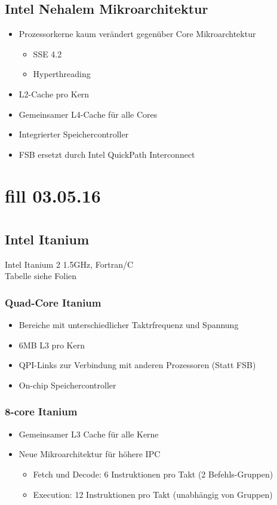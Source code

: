 \subsection{Intel Nehalem Mikroarchitektur}
\begin{itemize}
	\item Prozessorkerne kaum verändert gegenüber Core Mikroarchtektur
	\begin{itemize}
		\item SSE 4.2
		\item Hyperthreading
	\end{itemize}
	\item L2-Cache pro Kern
	\item Gemeinsamer L4-Cache für alle Cores
	\item Integrierter Speichercontroller
	\item FSB ersetzt durch Intel QuickPath Interconnect
\end{itemize}
\section{fill 03.05.16}
\section{}
\subsection{Intel Itanium}
Intel Itanium 2 1.5GHz, Fortran/C \\
Tabelle siehe Folien
\subsubsection{Quad-Core Itanium} 
\begin{itemize}
	\item Bereiche mit unterschiedlicher Taktrfrequenz und Spannung
	\item 6MB L3 pro Kern
	\item QPI-Links zur Verbindung mit anderen Prozessoren (Statt FSB)
	\item On-chip Speichercontroller
\end{itemize}
\subsubsection{8-core Itanium}
\begin{itemize}
	\item Gemeinsamer L3 Cache für alle Kerne
	\item Neue Mikroarchitektur für höhere IPC
	\begin{itemize}
		\item Fetch und Decode: 6 Instruktionen pro Takt (2 Befehls-Gruppen)
		\item Execution: 12 Instruktionen pro Takt (unabhängig von Gruppen)
	\end{itemize}
\end{itemize}
